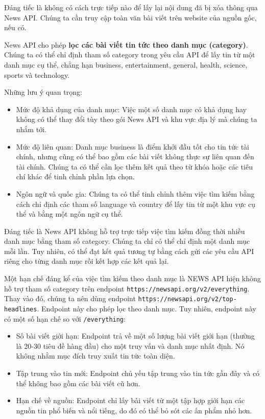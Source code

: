 Đáng tiếc là không có cách trực tiếp nào để lấy lại nội dung đã bị xóa thông qua News API. Chúng ta cần truy cập toàn văn bài viết trên website của nguồn gốc, nếu có.

News API cho phép \textbf{lọc các bài viết tin tức theo danh mục (category)}. Chúng ta có thể chỉ định tham số category trong yêu cầu API để lấy tin từ một danh mục cụ thể, chẳng hạn business, entertainment, general, health, science, sports và technology.

Những lưu ý quan trọng:

\begin{itemize}
\item
  Mức độ khả dụng của danh mục: Việc một số danh mục có khả dụng hay không có thể thay đổi tùy theo gói News API và khu vực địa lý mà chúng ta nhắm tới.
\item
  Mức độ liên quan: Danh mục business là điểm khởi đầu tốt cho tin tức tài chính, nhưng cũng có thể bao gồm các bài viết không thực sự liên quan đến tài chính. Chúng ta có thể cần lọc thêm kết quả theo từ khóa hoặc các tiêu chí khác để tinh chỉnh phần lựa chọn.
\item
  Ngôn ngữ và quốc gia: Chúng ta có thể tinh chỉnh thêm việc tìm kiếm bằng cách chỉ định các tham số language và country để lấy tin từ một khu vực cụ thể và bằng một ngôn ngữ cụ thể.
\end{itemize}

Đáng tiếc là News API không hỗ trợ trực tiếp việc tìm kiếm đồng thời nhiều danh mục bằng tham số category. Chúng ta chỉ có thể chỉ định một danh mục mỗi lần. Tuy nhiên, có thể đạt kết quả tương tự bằng cách gửi các yêu cầu API riêng cho từng danh mục rồi kết hợp các kết quả lại.

Một hạn chế đáng kể của việc tìm kiếm theo danh mục là NEWS API hiện không hỗ trợ tham số category trên endpoint \texttt{https://newsapi.org/v2/everything}. Thay vào đó, chúng ta nên dùng endpoint \texttt{https://newsapi.org/v2/top-headlines}. Endpoint này cho phép lọc theo danh mục. Tuy nhiên, endpoint này có một số hạn chế so với \texttt{/everything}:

\begin{itemize}
\item
  Số bài viết giới hạn: Endpoint trả về một số lượng bài viết giới hạn (thường là 20-30 tiêu đề hàng đầu) cho một truy vấn và danh mục nhất định. Nó không nhằm mục đích truy xuất tin tức toàn diện.
\item
  Tập trung vào tin mới: Endpoint chủ yếu tập trung vào tin tức gần đây và có thể không bao gồm các bài viết cũ hơn.
\item
  Hạn chế về nguồn: Endpoint chỉ lấy bài viết từ một tập hợp giới hạn các nguồn tin phổ biến và nổi tiếng, do đó có thể bỏ sót các ấn phẩm nhỏ hơn.
\end{itemize}

